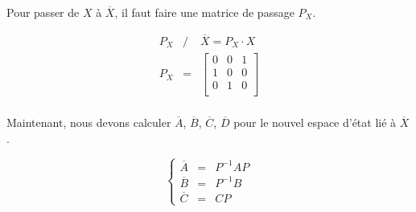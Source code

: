 Pour passer de $X$ à $\overline{X}$, il faut faire une matrice de passage $P_X$.

 \begin{eqnarray}
 P_X &/&  \overline{X} =P_X \cdot X \\
 P_X &=&\begin{bmatrix}
 0 & 0 & 1 \\
 1 & 0 & 0 \\
 0 & 1 & 0 \\
\end{bmatrix}  \\
 \end{eqnarray}

Maintenant, nous devons calculer $\overline{A}$, $\overline{B}$, $\overline{C}$, $\overline{D}$ pour le nouvel espace d'état lié à $\overline{X}$.

\begin{equation}%
	\left\lbrace%
	\begin{matrix}
		\overline{A} &=& P^{-1} A P \\%
		\overline{B} &=& P^{-1} B \\%
		\overline{C} &=& C P%
	\end{matrix}
\right.%
\end{equation}
